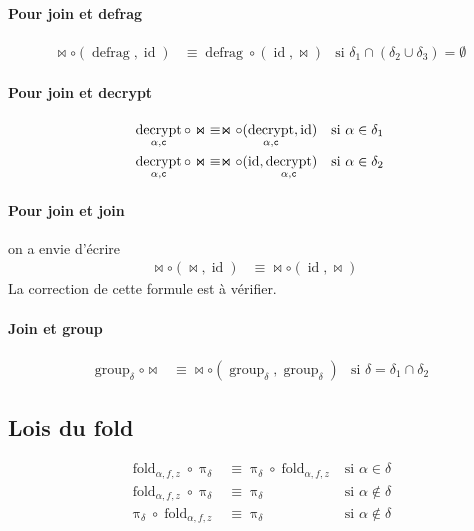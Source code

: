 \documentclass[french]{article}
\DeclareMathOperator{\proj}{\pi}
\DeclareMathOperator{\defrag}{defrag}
\DeclareMathOperator{\decrypt}{decrypt}
\DeclareMathOperator{\group}{group}
\DeclareMathOperator{\id}{id}
\newcommand\typeT[1]{\text{\ttfamily #1}}
\newcommand{\decryptArgs}[2]{\decrypt_{#1 , \typeT{#2}}}
\newcommand{\projDelta}{\proj_{\delta}}
\newcommand{\decryptCAlpha}{\decryptArgs{\alpha}{c}}
\newcommand{\groupDelta}{\group_{\delta}}
\newcommand{\fold}[3]{\operatorname{fold}_{#1, #2, #3}}
\newcommand{\foldAlphafz}{\fold{\alpha}{f}{z}}
\begin{document}
\paragraph{Pour join et defrag} 
\begin{align}
\Join \circ (\defrag, \id)
& \equiv
 \defrag \circ (\id, \Join)
& \text{si $\delta_1 \cap (\delta_2 \cup \delta_3) = \emptyset$}
\end{align}

\paragraph{Pour join et decrypt}
\begin{align}
\decryptCAlpha \circ \Join
& \equiv
\Join \circ (\decryptCAlpha, \id)
& \text{si $\alpha \in \delta_1$} \\
\decryptCAlpha \circ \Join
& \equiv
\Join \circ (\id, \decryptCAlpha)
& \text{si $\alpha \in \delta_2$} 
\end{align}

\paragraph{Pour join et join} on a envie d'écrire
\begin{align}
\Join \circ (\Join, \id)
& \equiv \Join \circ (\id, \Join) &
\end{align}
La correction de cette formule est à vérifier.

\paragraph{Join et group}
\begin{align}
\groupDelta \circ \Join
& \equiv \Join \circ (\groupDelta, \groupDelta)
& \text{si $\delta = \delta_1 \cap \delta_2$}
\end{align}


\subsection*{Lois du fold}
\begin{align}
\foldAlphafz \circ \projDelta
& \equiv \projDelta \circ \foldAlphafz
& \text{si $\alpha \in \delta$} \\
\foldAlphafz \circ \projDelta
& \equiv \projDelta
& \text{si $\alpha \notin \delta$} \\
\projDelta \circ \foldAlphafz
& \equiv \projDelta
& \text{si $\alpha \notin \delta$}
\end{align}
\end{document}
